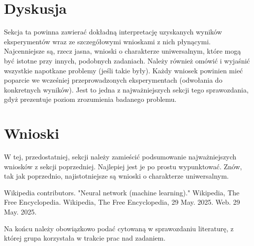 \documentclass{classrep}
\begin{document}
\section{Dyskusja}
 {\color{blue}
  Sekcja ta powinna zawierać dokładną interpretację uzyskanych wyników
  eksperymentów wraz ze szczegółowymi wnioskami z nich płynącymi. Najcenniejsze
  są, rzecz jasna, wnioski o charakterze uniwersalnym, które mogą być istotne
  przy innych, podobnych zadaniach. Należy również omówić i wyjaśnić wszystkie
  napotkane problemy (jeśli takie były). Każdy wniosek powinien mieć poparcie we
  wcześniej przeprowadzonych eksperymentach (odwołania do konkretnych wyników).
  Jest to jedna z najważniejszych sekcji tego sprawozdania, gdyż prezentuje
  poziom zrozumienia badanego problemu.}

\section{Wnioski}
 {\color{blue}
  W tej, przedostatniej, sekcji należy zamieścić podsumowanie najważniejszych
  wniosków z sekcji poprzedniej. Najlepiej jest je po prostu wypunktować. Znów,
  tak jak poprzednio, najistotniejsze są wnioski o charakterze uniwersalnym.}

\begin{thebibliography}{0}
	 Wikipedia contributors. "Neural network (machine learning)."
	Wikipedia, The Free Encyclopedia. Wikipedia, The Free Encyclopedia,
	29 May. 2025. Web. 29 May. 2025. \end{thebibliography}

{\color{blue}
Na końcu należy obowiązkowo podać cytowaną w sprawozdaniu literaturę, z której
grupa korzystała w trakcie prac nad zadaniem.}
\end{document}
